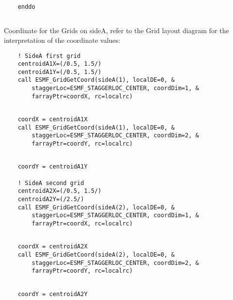  \begin{verbatim}
    enddo
 
\end{verbatim}
 

   Coordinate for the Grids on sideA, refer to the Grid layout diagram for the
   interpretation of the coordinate values: 

 \begin{verbatim}
    ! SideA first grid
    centroidA1X=(/0.5, 1.5/)
    centroidA1Y=(/0.5, 1.5/)
    call ESMF_GridGetCoord(sideA(1), localDE=0, &
        staggerLoc=ESMF_STAGGERLOC_CENTER, coordDim=1, &
        farrayPtr=coordX, rc=localrc)
 
\end{verbatim}
 

 \begin{verbatim}
    coordX = centroidA1X
    call ESMF_GridGetCoord(sideA(1), localDE=0, &
        staggerLoc=ESMF_STAGGERLOC_CENTER, coordDim=2, &
        farrayPtr=coordY, rc=localrc)
 
\end{verbatim}
 

 \begin{verbatim}
    coordY = centroidA1Y

    ! SideA second grid
    centroidA2X=(/0.5, 1.5/)
    centroidA2Y=(/2.5/)
    call ESMF_GridGetCoord(sideA(2), localDE=0, &
        staggerLoc=ESMF_STAGGERLOC_CENTER, coordDim=1, &
        farrayPtr=coordX, rc=localrc)
 
\end{verbatim}
 

 \begin{verbatim}
    coordX = centroidA2X
    call ESMF_GridGetCoord(sideA(2), localDE=0, &
        staggerLoc=ESMF_STAGGERLOC_CENTER, coordDim=2, &
        farrayPtr=coordY, rc=localrc)
 
\end{verbatim}
 

 \begin{verbatim}
    coordY = centroidA2Y
 
\end{verbatim}
 
